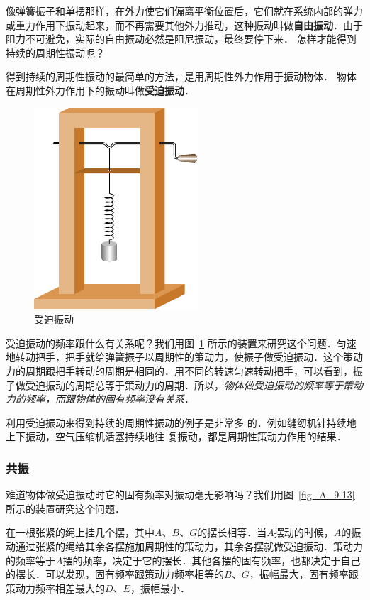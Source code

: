 像弹簧振子和单摆那样，在外力使它们偏离平衡位置后，它们就在系统内部的弹力或重力作用下振动起来，而不再需要其他外力推动，这种振动叫做\textbf{自由振动}．由于阻力不可避免，实际的自由振动必然是阻尼振动，最终要停下来．
怎样才能得到持续的周期性振动呢？

得到持续的周期性振动的最简单的方法，是用周期性外力作用于振动物体．
物体在周期性外力作用下的振动叫做\textbf{受迫振动}．
\begin{figure}[htbp]
    \centering
    \includegraphics{fig/A/9-12.pdf}
    \caption{受迫振动}\label{fig_A_9-12}
\end{figure}

受迫振动的频率跟什么有关系呢？我们用图~\ref{fig_A_9-12} 所示的装置来研究这个问题．匀速地转动把手，把手就给弹簧振子以周期性的策动力，使振子做受迫振动．这个策动力的周期跟把手转动的周期是相同的．用不同的转速匀速转动把手，可以看到，振子做受迫振动的周期总等于策动力的周期．所以，\textit{物体做受迫振动的频率等于策动力的频率，而跟物体的固有频率没有关系}．

利用受迫振动来得到持续的周期性振动的例子是非常多
的．例如缝纫机针持续地上下振动，空气压缩机活塞持续地往
复振动，都是周期性策动力作用的结果．

\subsubsection{共振}

难道物体做受迫振动时它的固有频率对振动毫无影响吗？我们用图~\ref{fig_A_9-13} 所示的装置研究这个问题．

在一根张紧的绳上挂几个摆，其中$A$、$B$、$G$的摆长相等．当$A$摆动的时候，$A$的振动通过张紧的绳给其余各摆施加周期性的策动力，其余各摆就做受迫振动．策动力的频率等于$A$摆的频率，决定于它的摆长．其他各摆的固有频率，也都决定于自己的摆长．可以发现，固有频率跟策动力频率相等的$B$、$G$，振幅最大，固有频率跟策动力频率相差最大的$D$、$E$，振幅最小．

